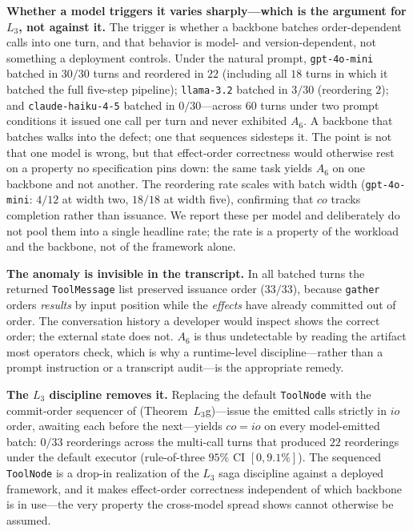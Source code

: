 \documentclass[journal,compsoc,10pt]{IEEEtran}
\theoremstyle{definition}
\theoremstyle{remark}
\newcommand{\fld}[1]{\mathit{#1}}
\begin{document}
\medskip
\noindent\textbf{Whether a model triggers it varies sharply---which is the
argument for $L_3$, not against it.} The trigger is whether a backbone batches
order-dependent calls into one turn, and that behavior is model- and
version-dependent, not something a deployment controls. Under the natural
prompt, \texttt{gpt-4o-mini} batched in $30/30$ turns and reordered in $22$
(including all $18$ turns in which it batched the full five-step pipeline);
\texttt{llama-3.2} batched in $3/30$ (reordering $2$); and
\texttt{claude-haiku-4-5} batched in $0/30$---across $60$ turns under two
prompt conditions it issued one call per turn and never exhibited $A_6$. A
backbone that batches walks into the defect; one that sequences sidesteps it.
The point is not that one model is wrong, but that effect-order correctness
would otherwise rest on a property no specification pins down: the same task
yields $A_6$ on one backbone and not another. The reordering rate scales with
batch width (\texttt{gpt-4o-mini}: $4/12$ at width two, $18/18$ at width five),
confirming that $\fld{co}$ tracks completion rather than issuance. We report
these per model and deliberately do not pool them into a single headline rate;
the rate is a property of the workload and the backbone, not of the framework
alone.

\medskip
\noindent\textbf{The anomaly is invisible in the transcript.} In all batched
turns the returned \texttt{ToolMessage} list preserved issuance order
($33/33$), because \texttt{gather} orders \emph{results} by input position
while the \emph{effects} have already committed out of order. The conversation
history a developer would inspect shows the correct order; the external state
does not. $A_6$ is thus undetectable by reading the artifact most operators
check, which is why a runtime-level discipline---rather than a prompt
instruction or a transcript audit---is the appropriate remedy.

\medskip
\noindent\textbf{The $L_3$ discipline removes it.} Replacing the default
\texttt{ToolNode} with the commit-order sequencer of 
(Theorem~$L_3$g)---issue the emitted calls strictly in $\fld{io}$ order,
awaiting each before the next---yields $\fld{co}=\fld{io}$ on every
model-emitted batch: $0/33$ reorderings across the multi-call turns that
produced $22$ reorderings under the default executor (rule-of-three $95\%$ CI
$[0,9.1\%]$). The sequenced \texttt{ToolNode} is a drop-in realization of the
$L_3$ saga discipline against a deployed framework, and it makes effect-order
correctness independent of which backbone is in use---the very property the
cross-model spread shows cannot otherwise be assumed.
\end{document}
